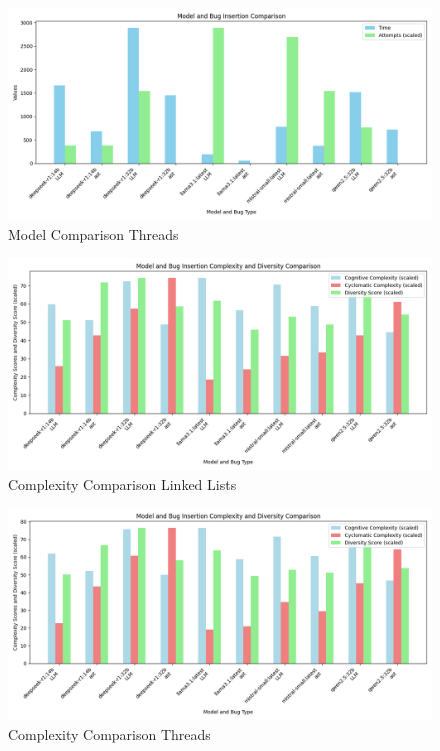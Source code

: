 \documentclass[12pt]{extarticle}
\begin{document}
\begin{figure}[h!]
\centering
\includegraphics[width=0.8\linewidth]{Images/Model_Comparison_Threads.png}
\caption{Model Comparison Threads}
\label{fig:Model_Comparison_Threads}
\end{figure}





\begin{figure}[h!]
\centering
\includegraphics[width=0.8\linewidth]{Images/Complexity_Comparison_Linked_Lists.png}
\caption{Complexity Comparison Linked Lists}
\label{fig:Complexity_Comparison_Linked_Lists}
\end{figure}

\begin{figure}[h!]
\centering
\includegraphics[width=0.8\linewidth]{Images/Complexity_Comparison_Threads.png}
\caption{Complexity Comparison Threads}
\label{fig:Complexity_Comparison_Threads}
\end{figure}
\end{document}

